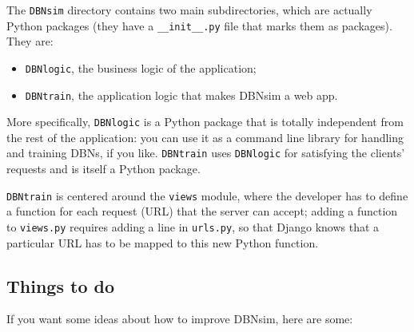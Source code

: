 \documentclass[a4paper]{article}
\begin{document}
The \texttt{DBNsim} directory contains two main subdirectories, which are actually Python packages (they have a \texttt{\_\_init\_\_.py} file that marks them as packages). They are:
		
	\begin{itemize}
		
			
	\item \texttt{DBNlogic}, the business logic of the application;
			
	\item \texttt{DBNtrain}, the application logic that makes DBNsim a web app.
		
	\end{itemize}

		
More specifically, \texttt{DBNlogic} is a Python package that is totally independent from the rest of the application: you can use it as a command line library for handling and training DBNs, if you like. \texttt{DBNtrain} uses \texttt{DBNlogic} for satisfying the clients' requests and is itself a Python package.
		
\texttt{DBNtrain} is centered around the \texttt{views} module, where the developer has to define a function for each request (URL) that the server can accept; adding a function to \texttt{views.py} requires adding a line in \texttt{urls.py}, so that Django knows that a particular URL has to be mapped to this new Python function.

		
	\subsection{Things to do}

		
If you want some ideas about how to improve DBNsim, here are some:
		
\end{document}
